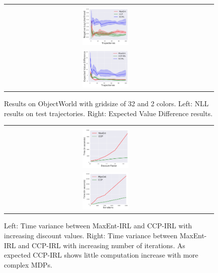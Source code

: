\documentclass{article}
\def\MSHangBox#1{%
\begin{minipage}[t]{\textwidth}%
\begin{tabbing} %
~\\[-\baselineskip] %
#1 %
\end{tabbing}%
\end{minipage}} %
\begin{document}
\begin{figure}[t]
\centering
  \begin{tabular}{cc}
    \MSHangBox{\includegraphics[width=0.23\textwidth]{images/objectworld/grid_32_obj_30_algo_3/test_nll_algo_3.pdf}}
    \MSHangBox{\includegraphics[width=0.23\textwidth]{images/objectworld/grid_32_obj_30_algo_3/test_evd_algo_3.pdf}}
  \end{tabular}
    \caption{Results on ObjectWorld with gridsize of 32 and 2 colors. Left: NLL results on test trajectories. Right: Expected Value Difference results. }
    \label{fig:img_objectworld_maxent_vs_ccp_lr_01}
\end{figure}

\begin{figure}[t]
\centering
  \begin{tabular}{cc}
    \MSHangBox{\includegraphics[width=0.23\textwidth]{images/objectworld/timeit_maxent_vs_ccp_grid_32_discount_value.pdf}}
    \MSHangBox{\includegraphics[width=0.23\textwidth]{images/objectworld/timeit_maxent_vs_ccp_grid_16_per_iter.pdf}}
  \end{tabular}
    \caption{Left: Time variance between MaxEnt-IRL and CCP-IRL with increasing discount values. Right: Time variance between MaxEnt-IRL and CCP-IRL with increasing number of iterations. As expected CCP-IRL shows little computation increase with more complex MDPs.}
    \label{fig:img_objectworld_maxent_vs_ccp_time_results}
\end{figure}
\end{document}
